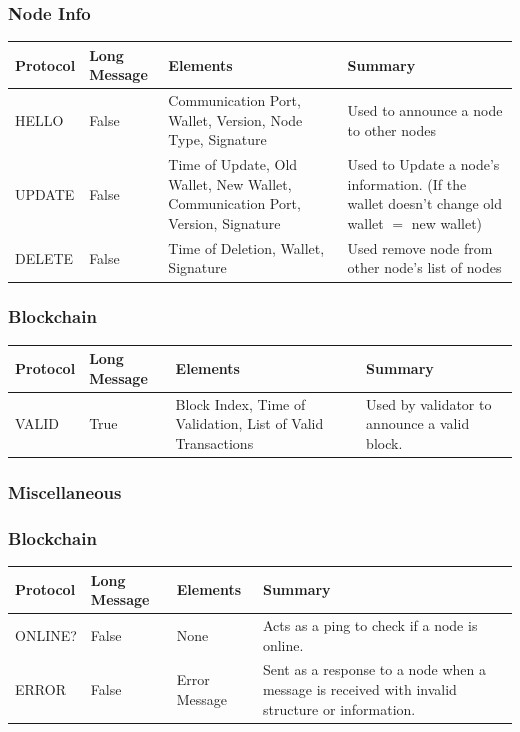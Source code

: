 \documentclass[11pt]{article}
\begin{document}
\subsubsection*{Node Info}
\begin{center}
%
\begin{tabularx}{\textwidth}{| l | l | R | R |} 
\hline
Protocol & Long Message & Elements & Summary \\ \hline
HELLO & False & Communication Port, Wallet, Version, Node Type, Signature & Used to announce a node to other nodes \\ \hline
UPDATE & False & Time of Update, Old Wallet, New Wallet, Communication Port, Version, Signature & Used to Update a node's information. (If the wallet doesn't change old wallet $=$ new wallet)\\ \hline
DELETE & False & Time of Deletion, Wallet, Signature & Used remove node from other node's list of nodes \\ \hline
\end{tabularx}
\end{center}

\subsubsection*{Blockchain}
\begin{center}
%
\begin{tabularx}{\textwidth}{| l | l | R | R |} 
\hline
Protocol & Long Message & Elements & Summary \\ \hline
VALID & True & Block Index, Time of Validation, List of Valid Transactions & Used by validator to announce a valid block.\\ \hline
\end{tabularx}
\end{center}

\subsubsection*{Miscellaneous}
\subsubsection*{Blockchain}
\begin{center}
%
\begin{tabularx}{\textwidth}{| l | l | R | R |} 
\hline
Protocol & Long Message & Elements & Summary \\ \hline
ONLINE? & False & None & Acts as a ping to check if a node is online. \\ \hline
ERROR & False & Error Message & Sent as a response to a node when a message is received with invalid structure or information. \\ \hline
\end{tabularx}
\end{center}
\end{document}
